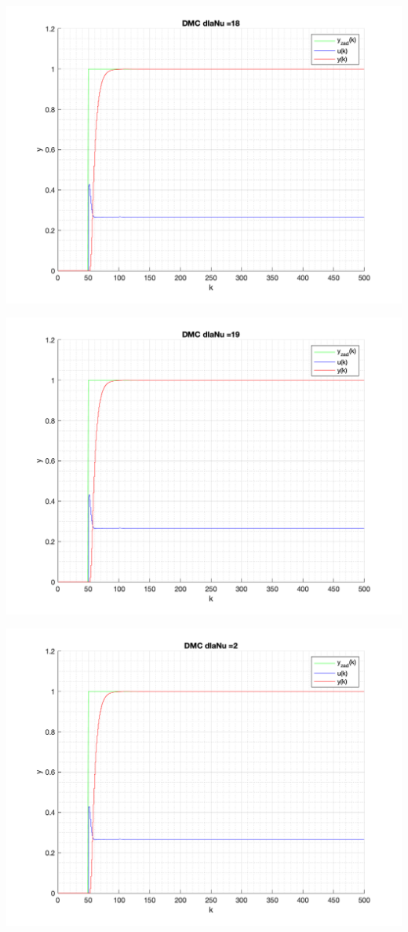 \documentclass[a4paper, 11pt]{article}
\begin{document}
\begin{enumerate}
 \includegraphics[width=\linewidth]{./ModelsP4_Nu/P4_DMC_Nu_18_png.png} 
 
 \includegraphics[width=\linewidth]{./ModelsP4_Nu/P4_DMC_Nu_19_png.png} 
 
 \includegraphics[width=\linewidth]{./ModelsP4_Nu/P4_DMC_Nu_2_png.png} 
 

\end{enumerate}
\end{document}
